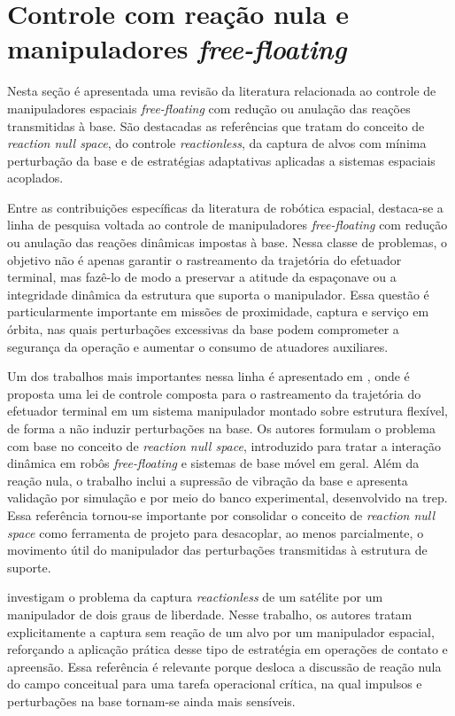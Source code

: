 \section{Controle com reação nula e manipuladores \textit{free-floating}}
\label{sec_reaction_null_free_floating}

Nesta seção é apresentada uma revisão da literatura relacionada ao controle de manipuladores espaciais \textit{free-floating} com redução ou anulação das reações transmitidas à base. São destacadas as referências que tratam do conceito de \textit{reaction null space}, do controle \textit{reactionless}, da captura de alvos com mínima perturbação da base e de estratégias adaptativas aplicadas a sistemas espaciais acoplados.

Entre as contribuições específicas da literatura de robótica espacial, destaca-se a linha de pesquisa voltada ao controle de manipuladores \textit{free-floating} com redução ou anulação das reações dinâmicas impostas à base. Nessa classe de problemas, o objetivo não é apenas garantir o rastreamento da trajetória do efetuador terminal, mas fazê-lo de modo a preservar a atitude da espaçonave ou a integridade dinâmica da estrutura que suporta o manipulador. Essa questão é particularmente importante em missões de proximidade, captura e serviço em órbita, nas quais perturbações excessivas da base podem comprometer a segurança da operação e aumentar o consumo de atuadores auxiliares.

Um dos trabalhos mais importantes nessa linha é apresentado em \cite{nenchev1999reaction}, onde é proposta uma lei de controle composta para o rastreamento da trajetória do efetuador terminal em um sistema manipulador montado sobre estrutura flexível, de forma a não induzir perturbações na base. Os autores formulam o problema com base no conceito de \textit{reaction null space}, introduzido para tratar a interação dinâmica em robôs \textit{free-floating} e sistemas de base móvel em geral.
Além da reação nula, o trabalho inclui a supressão de vibração da base e apresenta validação por simulação e por meio do banco experimental, desenvolvido na \gls{trep}.
Essa referência tornou-se importante por consolidar o conceito de \textit{reaction null space} como ferramenta de projeto para desacoplar, ao menos parcialmente, o movimento útil do manipulador das perturbações transmitidas à estrutura de suporte.

\cite{piersigilli2010reactionless} investigam o problema da captura \textit{reactionless} de um satélite por um manipulador de dois graus de liberdade. Nesse trabalho, os autores tratam explicitamente a captura sem reação de um alvo por um manipulador espacial, reforçando a aplicação prática desse tipo de estratégia em operações de contato e apreensão. Essa referência é relevante porque desloca a discussão de reação nula do campo conceitual para uma tarefa operacional crítica, na qual impulsos e perturbações na base tornam-se ainda mais sensíveis.

